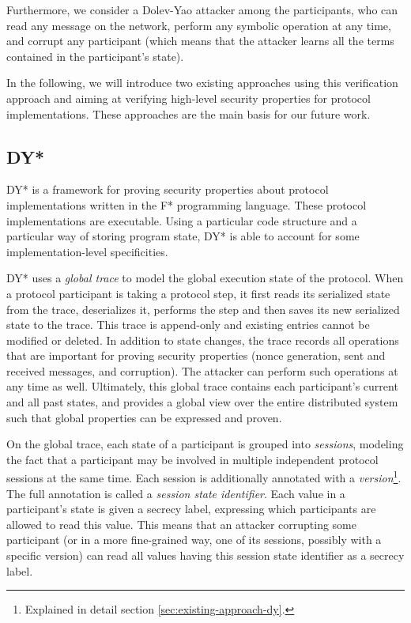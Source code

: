 \documentclass{article}
\begin{document}
Furthermore, we consider a Dolev-Yao\cite{dolev1983security} attacker among the participants, who can read any message on the network, perform any symbolic operation at any time, and corrupt any participant (which means that the attacker learns all the terms contained in the participant's state).

In the following, we will introduce two existing approaches using this verification approach and aiming at verifying high-level security properties for protocol implementations. These approaches are the main basis for our future work.

\subsection{DY*}

DY*\cite{bhargavan2021text} is a framework for proving security properties about protocol implementations written in the F* programming language. These protocol implementations are executable.
Using a particular code structure and a particular way of storing program state, DY* is able to account for some implementation-level specificities.

DY* uses a \textit{global trace} to model the global execution state of the protocol.
When a protocol participant is taking a protocol step, it first reads its serialized state from the trace, deserializes it, performs the step and then saves its new serialized state to the trace. This trace is append-only and existing entries cannot be modified or deleted. In addition to state changes, the trace records all operations that are important for proving security properties (nonce generation, sent and received messages, and corruption). The attacker can perform such operations at any time as well.
Ultimately, this global trace contains each participant's current and all past states, and provides a global view over the entire distributed system such that global properties can be expressed and proven.

On the global trace, each state of a participant is grouped into \textit{sessions}, modeling the fact that a participant may be involved in multiple independent protocol sessions at the same time.
Each session is additionally annotated with a \textit{version}\footnote{Explained in detail section \ref*{sec:existing-approach-dy}.}. The full annotation is called a \textit{session state identifier}.
Each value in a participant's state is given a secrecy label, expressing which participants are allowed to read this value. This means that an attacker corrupting some participant (or in a more fine-grained way, one of its sessions, possibly with a specific version) can read all values having this session state identifier as a secrecy label.
\end{document}
